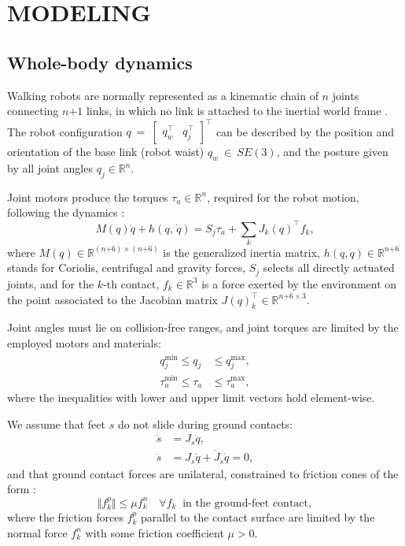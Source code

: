 \documentclass[letterpaper, 10 pt, conference]{ieeeconf}  %
\begin{document}
\section{MODELING}\label{Sec.Model}
\subsection{Whole-body dynamics}
Walking robots are normally represented as a kinematic chain of $ n $ joints connecting $ n\texttt{+}1 $ links, in which no link is attached to the inertial world frame \cite{Nava2016Stability}. The robot configuration $ q\!\!~=~\!\![\begin{matrix} 
q_{w}^{\top}& q_{j}^{\top}
\end{matrix}]^{\top}$ can be described by the position and orientation of the base link (robot waist) $ q_{w}\!\!\!~\in~\!\!\!\mathit{SE}(3)$, and the posture given by all joint angles $ q_{j}\in \mathbb{R}^{n} $.

Joint motors produce the torques $ \tau_{a}\in \mathbb{R}^{n} $, required for the robot motion, following the dynamics \cite{Handbook}:
%
\begin{equation}\label{eq.LagrangeanDynamics}
M(q)\ddot{q} + h(q,\, \dot{q}) = S_{j}\tau_{a} + \sum_{k} J_{k}(q)^\top f_{k},
\end{equation}
%
where $ M(q) \in \mathbb{R}^{(n\texttt{+}6)\times(n\texttt{+}6)} $ is the generalized inertia matrix, $ h(q, \dot{q}) \!\!\in \mathbb{R}^{n\texttt{+}6} $ stands for Coriolis, centrifugal and gravity forces, $ S_j $ selects all directly actuated joints, and for the $k$-th contact, $f_k\in\mathbb{R}^3$ is a force exerted by the environment on the point associated to the Jacobian matrix $J(q)^{\top}_{k}\!\!\in\mathbb{R}^{n\texttt{+}6\times 3}$.

Joint angles must lie on collision-free ranges, and joint torques are limited by the employed motors and materials:
\begin{align}
q^{\mathrm{min}}_{j}\leq q_{j}^{ }&\leq q^{\mathrm{max}}_{j},\label{eq.jointLimits}\\
\tau^{\mathrm{min}}_{a}\leq\tau_{a}&\leq\tau^{\mathrm{max}}_{a},\label{eq.torqueLimits}
\end{align}
%
where the inequalities with lower and upper limit vectors hold element-wise.

We assume that feet $s$ do not slide during ground contacts:
\begin{align}\label{eq.StaticContacts}
\dot{s} &= J_{s}\dot{q},\\
\ddot{s} &= J_{s}\ddot{q} + \dot{J}_{s}\dot{q}=0, \label{eq. NonSlidingCondition}
\end{align}
%
and that ground contact forces are unilateral, constrained to friction cones of the form \cite{Handbook}:
%
\begin{equation}\label{eq.Unilaterality and Friction}
\Vert f_{k}^{p}\Vert \leq \mu f_{k}^{n}\quad \forall f_k ~\text{ in the ground-feet contact},
\end{equation}
%
where the friction forces $f_{k}^{p}$ parallel to the contact surface are limited by the normal force $f_{k}^{n}$ with some friction coefficient $\mu > 0$.
\end{document}
